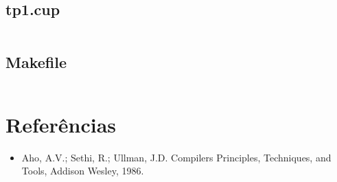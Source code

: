 \documentclass[a4paper,12pt]{report}
\begin{document}
\subsection{tp1.cup}

\begin{mdframed}[linecolor=black, leftline=false, rightline=false]
    \inputminted[linenos, fontsize=\footnotesize]{text}{../src/tp1.cup}
\end{mdframed}

\subsection{Makefile}

\begin{mdframed}[linecolor=black, leftline=false, rightline=false]
    \inputminted[linenos, fontsize=\footnotesize]{text}{../src/Makefile}
\end{mdframed}

\section{Referências}

\begin{itemize}
 \item Aho, A.V.; Sethi, R.; Ullman, J.D. Compilers Principles, Techniques, and
 Tools, Addison Wesley, 1986.
\end{itemize}
\end{document}
